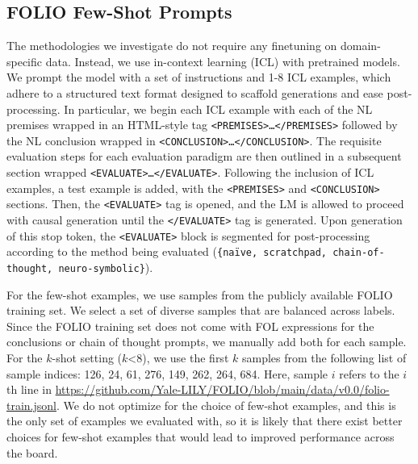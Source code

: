 \subsection{FOLIO Few-Shot Prompts}
\label{sec:appendix_folio_prompts}
The methodologies we investigate do not require any finetuning on domain-specific data.
Instead, we use in-context learning (ICL) with pretrained models.
We prompt the model with a set of instructions and 1-8 ICL examples, which adhere to a structured text format designed to scaffold generations and ease post-processing.
In particular, we begin each ICL example with each of the NL premises wrapped in an HTML-style tag \texttt{<PREMISES>\dots</PREMISES>} followed by the NL conclusion wrapped in \texttt{<CONCLUSION>\dots</CONCLUSION>}.
The requisite evaluation steps for each evaluation paradigm are then outlined in a subsequent section wrapped \texttt{<EVALUATE>\dots</EVALUATE>}.
Following the inclusion of ICL examples, a test example is added, with the \texttt{<PREMISES>} and \texttt{<CONCLUSION>} sections.
Then, the \texttt{<EVALUATE>} tag is opened, and the LM is allowed to proceed with causal generation until the \texttt{</EVALUATE>} tag is generated.
Upon generation of this stop token, the \texttt{<EVALUATE>} block is segmented for post-processing according to the method being evaluated (\texttt{\{na\"ive, scratchpad, chain-of-thought, neuro-symbolic\}}).

For the few-shot examples, we use samples from the publicly available FOLIO training set.
We select a set of diverse samples that are balanced across labels.
Since the FOLIO training set does not come with FOL expressions for the conclusions or chain of thought prompts, we manually add both for each sample.
For the $k$-shot setting ($k$<8), we use the first $k$ samples from the following list of sample indices: 126, 24, 61, 276, 149, 262, 264, 684.
Here, sample $i$ refers to the $i$th line in \url{https://github.com/Yale-LILY/FOLIO/blob/main/data/v0.0/folio-train.jsonl}.
We do not optimize for the choice of few-shot examples, and this is the only set of examples we evaluated with, so it is likely that there exist better choices for few-shot examples that would lead to improved performance across the board.
